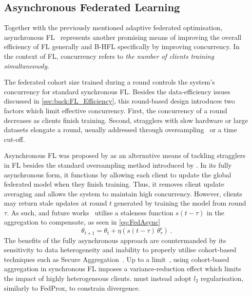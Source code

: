 \subsection{Asynchronous Federated Learning}
Together with the previously mentioned adaptive federated optimisation, asynchronous FL~\citep{AsyncFedOpt,FedBuff,PAPAYA,AsynchronousFLonHetDevicesSurvey,AsyncrhonousOnlineFL} represents another promising means of improving the overall efficiency of FL generally and B-HFL specifically by improving concurrency. In the context of FL, concurrency refers to \emph{the number of clients training simultaneously}.

The federated cohort size trained during a round controls the system's concurrency for standard synchronous FL\@. Besides the data-efficiency issues discussed in \cref{sec:back:FL_Efficiency}, this round-based design introduces two factors which limit effective concurrency. First, the concurrency of a round decreases as clients finish training. Second, stragglers with slow hardware or large datasets elongate a round, usually addressed through oversampling~\citep{ScaleSystemDesign} or a time cut-off.

Asynchronous FL was proposed by \citet{AsyncFedOpt} as an alternative means of tackling stragglers in FL besides the standard oversampling method introduced by \citet{ScaleSystemDesign}. In its fully asynchronous form, it functions by allowing each client to update the global federated model when they finish training. Thus, it removes client update averaging and allows the system to maintain high concurrency. However, clients may return stale updates at round $t$ generated by training the model from round $\tau$. As such, \citet{AsyncFedOpt} and future works~\citep{FedBuff,PAPAYA} utilise a staleness function $s(t-\tau)$ in the aggregation to compensate, as seen in \cref{eq:FedAsync}
\begin{equation} \label{eq:FedAsync}
    \theta_{t+1} = \theta_t + \eta  \left( s(t-\tau)\, \theta_{\tau}^c \right) \ .
\end{equation}
The benefits of the fully asynchronous approach are countermanded by its sensitivity to data heterogeneity and inability to properly utilise cohort-based techniques such as Secure Aggregation~\citep{SecAggOG}. Up to a limit~\citep{LargeCohorts,UnderstandingModelAveragingInFL,FedBuff,PAPAYA}, using cohort-based aggregation in synchronous FL imposes a variance-reduction effect which limits the impact of highly heterogeneous clients. \citet{AsyncFedOpt} must instead adopt $l_2$ regularisation, similarly to FedProx\citep{FedProx}, to constrain divergence.

